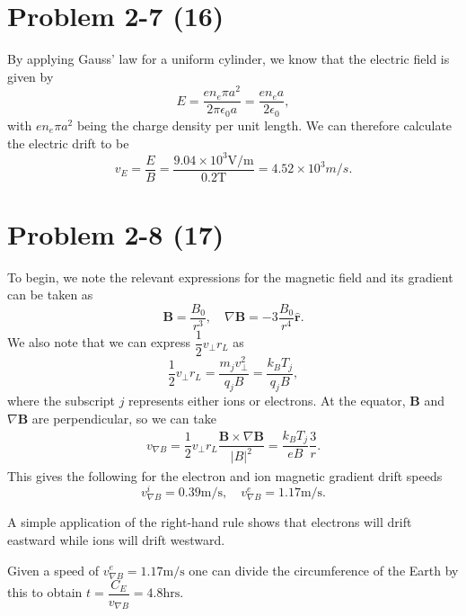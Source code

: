 \section*{Problem 2-7 (16)}
\label{sec:2-7}
By applying Gauss' law for a uniform cylinder, we know that the electric field is given by
\begin{equation}
	E = \dfrac{en_e\pi a^2}{2\pi \epsilon_0 a} = \dfrac{en_e a}{2 \epsilon_0},
\end{equation}
with \(en_e\pi a^2\) being the charge density per unit length. We can therefore calculate the electric drift to be
\begin{equation}
	v_E = \dfrac{E}{B} = \dfrac{9.04 \times 10^3 \text{V/m}}{0.2\text{T}} = 4.52 \times 10^3 m/s.
\end{equation}

\section*{Problem 2-8 (17)}
\label{sec:2-8}
To begin, we note the relevant expressions for the magnetic field and its gradient can be taken as
\begin{equation}
	\textbf{B} = \dfrac{B_0}{r^3}, \quad \nabla\textbf{B} = -3\dfrac{B_0}{r^4}\hat{\textbf{r}}.
\end{equation}
We also note that we can express \(\dfrac{1}{2} v_\perp r_L \) as
\begin{equation}
\dfrac{1}{2} v_\perp r_L = \dfrac{m_jv_\perp^2}{q_jB} = \dfrac{k_BT_j}{q_jB},
\end{equation}
where the subscript \(j\) represents either ions or electrons. At the equator, \(\textbf{B}\) and \(\nabla\textbf{B} \) are perpendicular, so we can take
\begin{align}
	v_{\nabla B} = \dfrac{1}{2} v_\perp r_L \dfrac{\textbf{B} \times \nabla \textbf{B}}{|B|^2} = \dfrac{k_BT_j}{eB}\dfrac{3}{r}.
\end{align}
This gives the following for the electron and ion magnetic gradient drift speeds
\begin{equation}
	v_{\nabla B}^i = 0.39\text{m/s}, \quad v_{\nabla B}^e = 1.17\text{m/s}.
\end{equation}

A simple application of the right-hand rule shows that electrons will drift eastward while ions will drift westward. 

Given a speed of \(v_{\nabla B}^e = 1.17\text{m/s} \) one can divide the circumference of the Earth by this to obtain \(t = \dfrac{C_E}{v_{\nabla B}} = 4.8\text{hrs}\).

